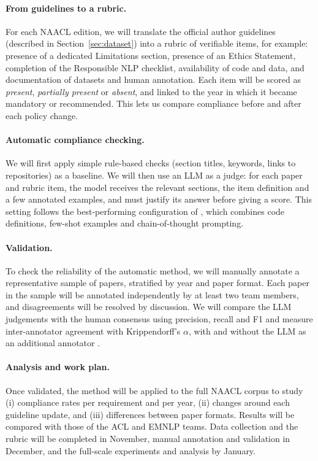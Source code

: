 \documentclass[11pt]{article}
\begin{document}
\paragraph{From guidelines to a rubric.}
For each NAACL edition, we will translate the official author guidelines (described in Section~\ref{sec:dataset}) into a rubric of verifiable items, for example: presence of a dedicated Limitations section, presence of an Ethics Statement, completion of the Responsible NLP checklist, availability of code and data, and documentation of datasets and human annotation. Each item will be scored as \emph{present}, \emph{partially present} or \emph{absent}, and linked to the year in which it became mandatory or recommended. This lets us compare compliance before and after each policy change.

\paragraph{Automatic compliance checking.}
We will first apply simple rule-based checks (section titles, keywords, links to repositories) as a baseline. We will then use an LLM as a judge: for each paper and rubric item, the model receives the relevant sections, the item definition and a few annotated examples, and must justify its answer before giving a score. This setting follows the best-performing configuration of , which combines code definitions, few-shot examples and chain-of-thought prompting.

\paragraph{Validation.}
To check the reliability of the automatic method, we will manually annotate a representative sample of papers, stratified by year and paper format. Each paper in the sample will be annotated independently by at least two team members, and disagreements will be resolved by discussion. We will compare the LLM judgements with the human consensus using precision, recall and F1 and measure inter-annotator agreement with Krippendorff's $\alpha$, with and without the LLM as an additional annotator \cite{thaepprasit-etal-2026-limits}.

\paragraph{Analysis and work plan.}
Once validated, the method will be applied to the full NAACL corpus to study (i) compliance rates per requirement and per year, (ii) changes around each guideline update, and (iii) differences between paper formats. Results will be compared with those of the ACL and EMNLP teams. Data collection and the rubric will be completed in November, manual annotation and validation in December, and the full-scale experiments and analysis by January.
\end{document}
